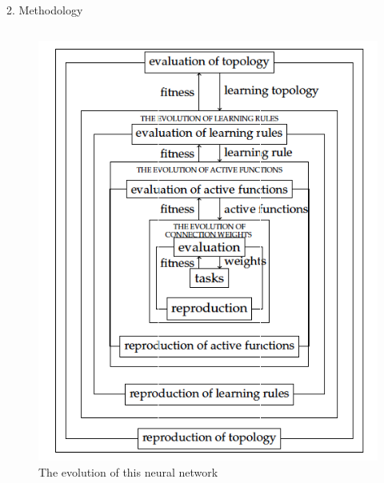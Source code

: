 \documentclass{beamer}
\begin{document}
\begin{frame}{2. Methodology \hfill }
	\begin{columns}
		\begin{column}{0.8\textwidth}
			\begin{figure}
				\includegraphics[width=0.7\linewidth]{fig/part3/architecture_of_evolution.png}
				\caption{The evolution of this neural network}
			\end{figure}
		\end{column}
	\end{columns}
\end{frame}

\end{document}
